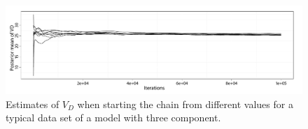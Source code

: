 \begin{figure}[t]
  \linespread{1.1}\selectfont
  \includegraphics[width=\linewidth]{fig_src/PET_VD}
  \caption[Convergence diagnostics for the random walk algorithm for the
  \protect\pet compartmental model using averages]
  {Estimates of $V_D$ when starting the \mcmc chain from different
    values for a typical data set of a \pet model with three component.}
  \label{fig:pet vd mean}
\end{figure}
